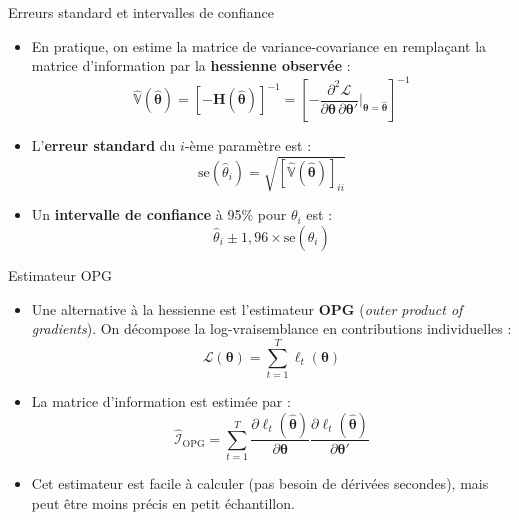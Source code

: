 \documentclass[11pt,aspectratio=169]{beamer}
\newcommand{\Var}{\mathbb{V}}
\begin{document}
\begin{frame}{Erreurs standard et intervalles de confiance}

\begin{itemize}

\item En pratique, on estime la matrice de variance-covariance en remplaçant la matrice d'information par la \textbf{hessienne observée} :
  \[
  \widehat{\Var}(\hat{\bm{\theta}}) = \left[-\mathbf{H}(\hat{\bm{\theta}})\right]^{-1} = \left[-\frac{\partial^2 \mathcal{L}}{\partial \bm{\theta}\, \partial \bm{\theta}'}\bigg|_{\bm{\theta}=\hat{\bm{\theta}}}\right]^{-1}
  \]\newline

\item L'\textbf{erreur standard} du $i$-ème paramètre est :
  \[
  \text{se}(\hat{\theta}_i) = \sqrt{\left[\widehat{\Var}(\hat{\bm{\theta}})\right]_{ii}}
  \]\newline

\item Un \textbf{intervalle de confiance} à 95\% pour $\theta_i$ est :
  \[
  \hat{\theta}_i \pm 1{,}96 \times \text{se}(\hat{\theta}_i)
  \]

\end{itemize}

\end{frame}

\begin{frame}{Estimateur OPG}

\begin{itemize}

\item Une alternative à la hessienne est l'estimateur \textbf{OPG} (\emph{outer product of gradients}). On décompose la log-vraisemblance en contributions individuelles :
  \[
  \mathcal{L}(\bm{\theta}) = \sum_{t=1}^{T} \ell_t(\bm{\theta})
  \]\newline

\item La matrice d'information est estimée par :
  \[
  \widehat{\mathcal{I}}_{\text{OPG}} = \sum_{t=1}^{T} \frac{\partial \ell_t(\hat{\bm{\theta}})}{\partial \bm{\theta}} \frac{\partial \ell_t(\hat{\bm{\theta}})}{\partial \bm{\theta}'}
  \]\newline

\item Cet estimateur est facile à calculer (pas besoin de dérivées secondes), mais peut être moins précis en petit échantillon.

\end{itemize}

\end{frame}
\end{document}

